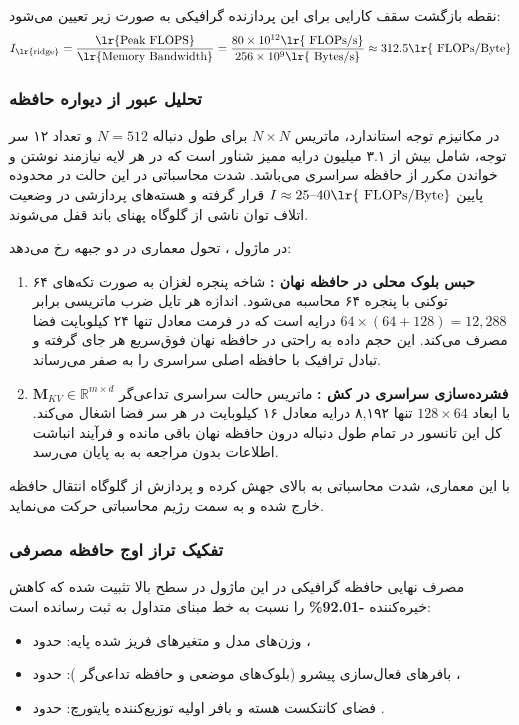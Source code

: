 نقطه بازگشت سقف کارایی  برای این پردازنده گرافیکی به صورت زیر تعیین می‌شود:
\begin{equation}
I_{\text{\lr{ridge}}} = \frac{\text{\lr{Peak FLOPS}}}{\text{\lr{Memory Bandwidth}}} = \frac{80 \times 10^{12} \text{\lr{ FLOPs/s}}}{256 \times 10^9 \text{\lr{ Bytes/s}}} \approx 312.5 \text{\lr{ FLOPs/Byte}}
\end{equation}

\subsubsection*{تحلیل عبور از دیواره حافظه }
در مکانیزم توجه استاندارد، ماتریس $N \times N$ برای طول دنباله $N=512$ و تعداد ۱۲ سر توجه، شامل بیش از ۳.۱ میلیون درایه ممیز شناور است که در هر لایه نیازمند نوشتن و خواندن مکرر از حافظه سراسری  می‌باشد. شدت محاسباتی در این حالت در محدوده پایین $I \approx 25\text{--}40 \text{\lr{ FLOPs/Byte}}$ قرار گرفته و هسته‌های پردازشی در وضعیت اتلاف توان ناشی از گلوگاه پهنای باند  قفل می‌شوند.

در ماژول ، تحول معماری در دو جبهه رخ می‌دهد:
\begin{enumerate}
    \item \textbf{حبس بلوک محلی در حافظه نهان :} شاخه پنجره لغزان به صورت تکه‌های ۶۴ توکنی با پنجره ۶۴ محاسبه می‌شود. اندازه هر تایل ضرب ماتریسی برابر $64 \times (64 + 128) = 12,288$ درایه است که در فرمت  معادل تنها ۲۴ کیلوبایت فضا مصرف می‌کند. این حجم داده به راحتی در حافظه نهان فوق‌سریع  هر  جای گرفته و تبادل ترافیک با حافظه اصلی سراسری را به صفر می‌رساند.
    \item \textbf{فشرده‌سازی سراسری در کش :} ماتریس حالت سراسری تداعی‌گر $\mathbf{M}_{KV} \in \mathbb{R}^{m \times d}$ با ابعاد $128 \times 64$ تنها ۸,۱۹۲ درایه معادل ۱۶ کیلوبایت در هر سر فضا اشغال می‌کند. کل این تانسور در تمام طول دنباله درون حافظه نهان  باقی مانده و فرآیند انباشت اطلاعات بدون مراجعه به  به پایان می‌رسد.
\end{enumerate}

با این معماری، شدت محاسباتی به بالای  جهش کرده و پردازش از گلوگاه انتقال حافظه خارج شده و به سمت رژیم محاسباتی  حرکت می‌نماید.

\subsubsection*{تفکیک تراز اوج حافظه مصرفی }
مصرف نهایی حافظه گرافیکی در این ماژول در سطح بالا  تثبیت شده که کاهش خیره‌کننده \textbf{-92.01\%} را نسبت به خط مبنای متداول  به ثبت رسانده است:
\begin{itemize}
    \item وزن‌های مدل و متغیرهای فریز شده پایه: حدود ،
    \item بافرهای فعال‌سازی پیشرو (بلوک‌های موضعی و حافظه تداعی‌گر ): حدود ،
    \item فضای کانتکست هسته  و بافر اولیه توزیع‌کننده پایتورچ: حدود .
\end{itemize}

